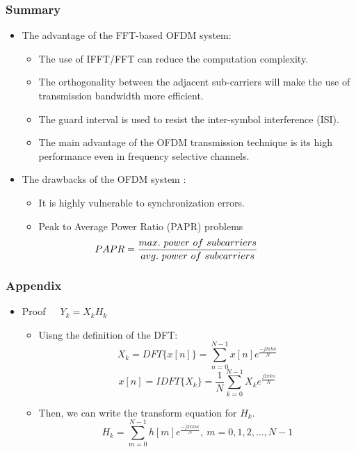 \documentclass[xcolor=dvipsnames]{beamer} %
\def\\{}%
\begin{document}
\begin{frame}
    \frametitle{Summary}
    \begin{itemize}
        \item The advantage of the FFT-based OFDM system:
        \begin{itemize}
            \item The use of IFFT/FFT can reduce the computation complexity.
            \item The orthogonality between the adjacent sub-carriers will make the use of transmission bandwidth more efficient.
            \item The guard interval is used to resist the inter-symbol interference (ISI).
            \item The main advantage of the OFDM transmission technique is its high performance even in frequency selective channels.
        \end{itemize}
    \end{itemize}
    \begin{itemize}
        \item The drawbacks of the OFDM system :
        \begin{itemize}
            \item It is highly vulnerable to synchronization errors.
            \item Peak to Average Power Ratio (PAPR) problems
            \[
                \hspace{-1.5cm} PAPR = \frac{max.\ power\ of\ subcarriers}{avg.\ power\ of\ subcarriers}
            \]
        \end{itemize}
    \end{itemize}
\end{frame}
\begin{frame}
\frametitle{Appendix}
\begin{itemize}
  \item Proof\ \ \ \textbf{$Y_{k}=X_{k}H_{k}$}\\
  \begin{itemize}
    \item Uisng the definition of the DFT:
    \[X_{k} = DFT\bigg\{x[n]\bigg\} = \sum_{n=0}^{N-1}x[n]e^\frac{-j2{\pi}kn}{N}\]
  \[x[n] = IDFT\bigg\{X_{k}\bigg\} = \frac{1}{N}\sum_{k=0}^{N-1}X_{k}e^\frac{j2{\pi}kn}{N}\]
    \item Then, we can write the transform equation for $H_{k}$.
    \[H_{k} = \sum_{m=0}^{N-1}h[m]e^\frac{-j2{\pi}km}{N},\ m=0,1,2,...,N-1\]
  \end{itemize}
\end{itemize}
\end{frame}
\end{document}
